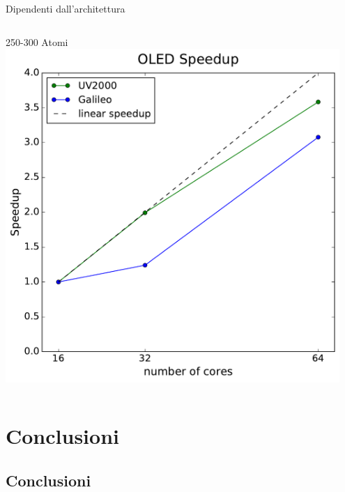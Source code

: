 \documentclass[8pt]{beamer}
\begin{document}
\begin{frame}{Dipendenti dall'architettura}
\begin{columns}

	\begin{center}	
		250-300 Atomi\\
		\includegraphics[width=0.95\textwidth]{concl_oled.pdf}			
	\end{center}		
	
	
	\end{columns}

\end{frame}






\section{Conclusioni}
\subsection{Conclusioni}
\end{document}

